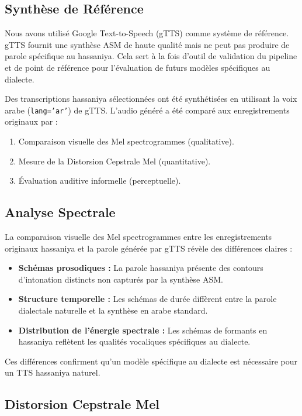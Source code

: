 \documentclass[12pt,a4paper]{article}
\begin{document}
\subsection{Synthèse de Référence}

Nous avons utilisé Google Text-to-Speech (gTTS) comme système de référence. gTTS fournit une synthèse ASM de haute qualité mais ne peut pas produire de parole spécifique au hassaniya. Cela sert à la fois d'outil de validation du pipeline et de point de référence pour l'évaluation de futurs modèles spécifiques au dialecte.

Des transcriptions hassaniya sélectionnées ont été synthétisées en utilisant la voix arabe (\texttt{lang='ar'}) de gTTS. L'audio généré a été comparé aux enregistrements originaux par :

\begin{enumerate}
    \item Comparaison visuelle des Mel spectrogrammes (qualitative).
    \item Mesure de la Distorsion Cepstrale Mel (quantitative).
    \item Évaluation auditive informelle (perceptuelle).
\end{enumerate}

\subsection{Analyse Spectrale}

La comparaison visuelle des Mel spectrogrammes entre les enregistrements originaux hassaniya et la parole générée par gTTS révèle des différences claires :

\begin{itemize}
    \item \textbf{Schémas prosodiques :} La parole hassaniya présente des contours d'intonation distincts non capturés par la synthèse ASM.
    \item \textbf{Structure temporelle :} Les schémas de durée diffèrent entre la parole dialectale naturelle et la synthèse en arabe standard.
    \item \textbf{Distribution de l'énergie spectrale :} Les schémas de formants en hassaniya reflètent les qualités vocaliques spécifiques au dialecte.
\end{itemize}

Ces différences confirment qu'un modèle spécifique au dialecte est nécessaire pour un TTS hassaniya naturel.

\subsection{Distorsion Cepstrale Mel}
\end{document}
